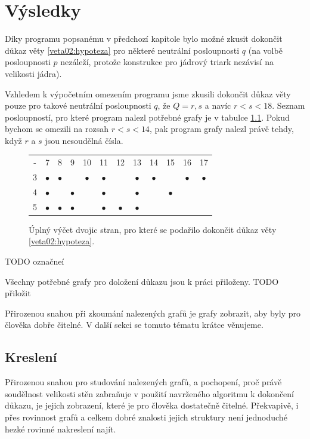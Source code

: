 
\chapter{Výsledky}

Díky programu popsanému v předchozí kapitole bylo možné zkusit dokončit důkaz věty \eqref{veta02:hypoteza} pro některé neutrální posloupnosti $q$ (na volbě posloupnosti $p$ nezáleží, protože konstrukce pro jádrový triark nezávisí na velikosti jádra). 

Vzhledem k výpočetním omezením programu jsme zkusili dokončit důkaz věty pouze pro takové neutrální posloupnosti $q$, že $Q = {r, s}$ a navíc $r<s<18$. Seznam posloupností, pro které program nalezl potřebné grafy je v tabulce \ref{obr03:tabvysledky}. Pokud bychom se omezili na rozsah $r<s<14$, pak program grafy nalezl právě tehdy, když $r$ a $s$ jsou nesoudělná čísla.

\begin{figure}[h]\centering
\begin{tabular}{ c c c c c c c c c c c c }
  - & 7 & 8 & 9 & 10 & 11 & 12 & 13 & 14 & 15 & 16 & 17 \\
  3 & $\bullet$ & $\bullet$ &  & $\bullet$ & $\bullet$ &  & $\bullet$ & $\bullet$ &  & $\bullet$ & $\bullet$ \\
  4 & $\bullet$ &  & $\bullet$ &  & $\bullet$ &  & $\bullet$ &  & $\bullet$ \\
  5 & $\bullet$ & $\bullet$ & $\bullet$ &  & $\bullet$ & $\bullet$ & $\bullet$  
\end{tabular}
\caption{Úplný výčet dvojic stran, pro které se podařilo dokončit důkaz věty \eqref{veta02:hypoteza}.}
\label{obr03:tabvysledky}
\end{figure}
TODO označneí

Všechny potřebné grafy pro doložení důkazu jsou k práci přiloženy. TODO přiložit

Přirozenou snahou při zkoumání nalezených grafů je grafy zobrazit, aby byly pro člověka dobře čitelné. V další sekci se tomuto tématu krátce věnujeme. 

\section{Kreslení}

Přirozenou snahou pro studování nalezených grafů, a pochopení, proč právě soudělnost velikosti stěn zabraňuje v použití navrženého algoritmu k dokončení důkazu, je jejich zobrazení, které je pro člověka dostatečně čitelné. Překvapivě, i přes rovinnost grafů a celkem dobré znalosti jejich struktury není jednoduché hezké rovinné nakreslení najít.

